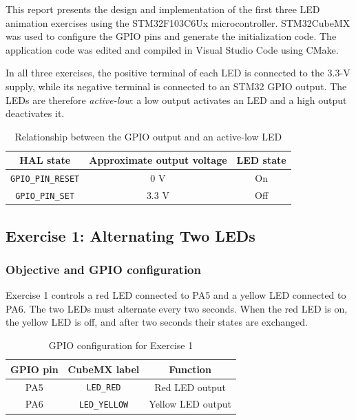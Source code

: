 \documentclass[a4paper]{article}
\begin{document}
This report presents the design and implementation of the first three LED
animation exercises using the STM32F103C6Ux microcontroller. STM32CubeMX was
used to configure the GPIO pins and generate the initialization code. The
application code was edited and compiled in Visual Studio Code using CMake.

In all three exercises, the positive terminal of each LED is connected to the
3.3-V supply, while its negative terminal is connected to an STM32 GPIO output.
The LEDs are therefore \textit{active-low}: a low output activates an LED and a
high output deactivates it.

\begin{table}[H]
    \centering
    \caption{Relationship between the GPIO output and an active-low LED}
    \label{tab:active-low}
    \begin{tabular}{ccc}
        \toprule
        \textbf{HAL state} & \textbf{Approximate output voltage} & \textbf{LED state} \\
        \midrule
        \texttt{GPIO\_PIN\_RESET} & 0 V & On \\
        \texttt{GPIO\_PIN\_SET} & 3.3 V & Off \\
        \bottomrule
    \end{tabular}
\end{table}

\subsection{Exercise 1: Alternating Two LEDs}

\subsubsection{Objective and GPIO configuration}

Exercise 1 controls a red LED connected to PA5 and a yellow LED connected to
PA6. The two LEDs must alternate every two seconds. When the red LED is on, the
yellow LED is off, and after two seconds their states are exchanged.

\begin{table}[H]
    \centering
    \caption{GPIO configuration for Exercise 1}
    \label{tab:exercise1-gpio}
    \begin{tabular}{ccc}
        \toprule
        \textbf{GPIO pin} & \textbf{CubeMX label} & \textbf{Function} \\
        \midrule
        PA5 & \texttt{LED\_RED} & Red LED output \\
        PA6 & \texttt{LED\_YELLOW} & Yellow LED output \\
        \bottomrule
    \end{tabular}
\end{table}
\end{document}
